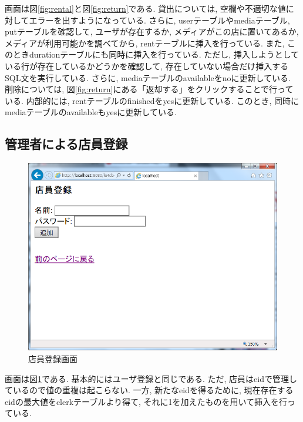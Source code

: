 \documentclass{jarticle}
\begin{document}
画面は図\ref{fig:rental}と図\ref{fig:return}である. 貸出については, 空欄や不適切な値に対してエラーを出すようになっている. さらに, userテーブルやmediaテーブル, putテーブルを確認して, ユーザが存在するか, メディアがこの店に置いてあるか, メディアが利用可能かを調べてから, rentテーブルに挿入を行っている. また, このときdurationテーブルにも同時に挿入を行っている. ただし, 挿入しようとしている行が存在しているかどうかを確認して, 存在していない場合だけ挿入するSQL文を実行している. さらに, mediaテーブルのavailableをnoに更新している. 削除については, 図\ref{fig:return}にある「返却する」をクリックすることで行っている. 内部的には, rentテーブルのfinishedをyesに更新している. このとき, 同時にmediaテーブルのavailableもyesに更新している.

\subsection{管理者による店員登録}
\begin{figure}[tp]
\begin{center}
\includegraphics[scale=0.5]{add_clerk.png}
\end{center}
\caption{店員登録画面}
\label{fig:add_clerk}
\end{figure}
画面は図\ref{fig:add_clerk}である. 基本的にはユーザ登録と同じである. ただ, 店員はeidで管理しているので値の重複は起こらない. 一方, 新たなeidを得るために, 現在存在するeidの最大値をclerkテーブルより得て, それに1を加えたものを用いて挿入を行っている.
\end{document}
